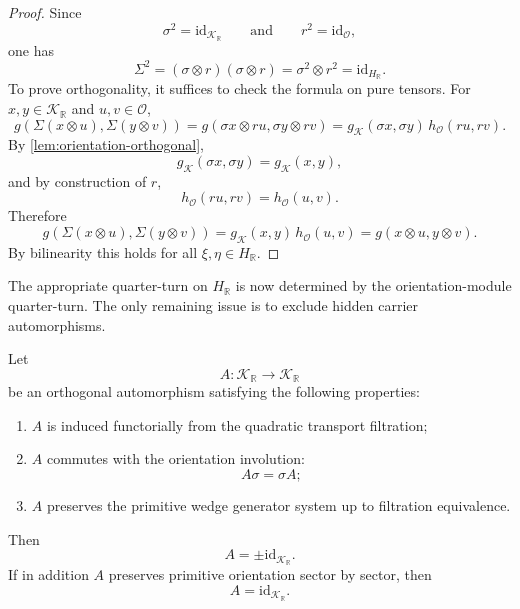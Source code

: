 \begin{proof}
	Since
	\[
		\sigma^{2}=\mathrm{id}_{\mathcal K_{\mathbb R}}
		\qquad\text{and}\qquad
		r^{2}=\mathrm{id}_{\mathcal O},
	\]
	one has
	\[
		\Sigma^{2}
		=
		(\sigma\otimes r)(\sigma\otimes r)
		=
		\sigma^{2}\otimes r^{2}
		=
		\mathrm{id}_{H_{\mathbb R}}.
	\]
	To prove orthogonality, it suffices to check the formula on pure
	tensors.
	For \(x,y\in\mathcal K_{\mathbb R}\) and \(u,v\in\mathcal O\),
	\[
		g(\Sigma(x\otimes u),\Sigma(y\otimes v))
		=
		g(\sigma x\otimes ru,\sigma y\otimes rv)
		=
		g_{\mathcal K}(\sigma x,\sigma y)\,h_{\mathcal O}(ru,rv).
	\]
	By \cref{lem:orientation-orthogonal},
	\[
		g_{\mathcal K}(\sigma x,\sigma y)=g_{\mathcal K}(x,y),
	\]
	and by construction of \(r\),
	\[
		h_{\mathcal O}(ru,rv)=h_{\mathcal O}(u,v).
	\]
	Therefore
	\[
		g(\Sigma(x\otimes u),\Sigma(y\otimes v))
		=
		g_{\mathcal K}(x,y)\,h_{\mathcal O}(u,v)
		=
		g(x\otimes u,y\otimes v).
	\]
	By bilinearity this holds for all \(\xi,\eta\in H_{\mathbb R}\).
\end{proof}
The appropriate quarter-turn on \(H_{\mathbb R}\) is now determined by the
orientation-module quarter-turn.
The only remaining issue is to exclude hidden carrier automorphisms.
\begin{lemma}
	\label{lem:hilbert-carrier-rigidity}
	Let
	\[
		A:\mathcal K_{\mathbb R}\to\mathcal K_{\mathbb R}
	\]
	be an orthogonal automorphism satisfying the following properties:
	\begin{enumerate}[label=\textup{(\roman*)}]
		\item
		      \(A\) is induced functorially from the quadratic transport filtration;
		\item
		      \(A\) commutes with the orientation involution:
		      \[
			      A\sigma=\sigma A;
		      \]
		\item
		      \(A\) preserves the primitive wedge generator system up to filtration
		      equivalence.
	\end{enumerate}
	Then
	\[
		A=\pm\mathrm{id}_{\mathcal K_{\mathbb R}}.
	\]
	If in addition \(A\) preserves primitive orientation sector by sector,
	then
	\[
		A=\mathrm{id}_{\mathcal K_{\mathbb R}}.
	\]
\end{lemma}
